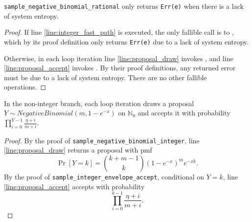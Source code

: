 \documentclass{article}
\begin{document}
\begin{lemma}
\label{lem:err-e}
\texttt{sample\_negative\_binomial\_rational} only returns \texttt{Err(e)} when there is a lack of system entropy.
\end{lemma}
\begin{proof}
If line \ref{line:integer_fast_path} is executed, the only fallible call is to
,
which by its proof definition only returns \texttt{Err(e)} due to a lack of system entropy.

Otherwise, in each loop iteration line \ref{line:proposal_draw} invokes
,
and line \ref{line:proposal_accept} invokes
.
By their proof definitions, any returned error must be due to a lack of system entropy.
There are no other fallible operations.
\end{proof}

\begin{lemma}
\label{lem:proposal-law}
In the non-integer branch, each loop iteration draws a proposal
$Y \sim NegativeBinomial(m, 1 - e^{-x})$ on $\mathbb{N}_0$ and accepts it with probability
$\prod_{i=0}^{Y-1}\frac{\eta + i}{m + i}$.
\end{lemma}
\begin{proof}
By the proof of \texttt{sample\_negative\_binomial\_integer}, line \ref{line:proposal_draw}
returns a proposal with pmf
\begin{equation*}
\Pr[Y = k] = \binom{k + m - 1}{k}(1 - e^{-x})^m e^{-xk}.
\end{equation*}
By the proof of \texttt{sample\_integer\_envelope\_accept}, conditional on $Y = k$,
line \ref{line:proposal_accept} accepts with probability
\begin{equation*}
\prod_{i=0}^{k-1}\frac{\eta + i}{m + i}.
\end{equation*}
\end{proof}
\end{document}
